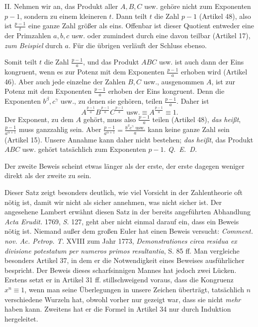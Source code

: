 II. Nehmen wir an, das Produkt aller $A,B,C$ usw. gehöre nicht zum Exponenten $p-1$, sondern zu einem kleineren $t$. Dann teilt $t$ die Zahl $p-1$ (Artikel 48), also ist $\frac{p-1}{t}$ eine ganze Zahl größer als eins. Offenbar ist dieser Quotient entweder eine der Primzahlen $a,b,c$ usw. oder zumindest durch eine davon teilbar (Artikel 17), \emph{zum Beispiel} durch $a$. Für die übrigen verläuft der Schluss ebenso.

Somit teilt $t$ die Zahl $\frac{p-1}{a}$, und das Produkt $ABC$ usw. ist auch dann der Eins kongruent, wenn es zur Potenz mit dem Exponenten ${\frac{p-1}{a}}$ erhoben wird (Artikel 46). Aber auch jede einzelne der Zahlen $B,C$ usw., ausgenommen $A$, ist zur Potenz mit dem Exponenten ${\frac{p-1}{a}}$ erhoben der Eins kongruent. Denn die Exponenten $b^\beta,c^\gamma$ usw., zu denen sie gehören, teilen $\frac{p-1}{a}$. Daher ist
\[A^{\frac{p-1}{a}}B^{\frac{p-1}{a}}C^{\frac{p-1}{a}}\text{ usw.}\equiv A^{\frac{p-1}{a}}\equiv1.\]
Der Exponent, zu dem $A$ gehört, muss also $\frac{p-1}{a}$ teilen (Artikel 48), \emph{das heißt}, $\frac{p-1}{a^{\alpha+1}}$ muss ganzzahlig sein. Aber $\frac{p-1}{a^{\alpha+1}}=\frac{b^\beta c^\gamma\text{ usw.}}{a}$ kann keine ganze Zahl sein (Artikel 15). Unsere Annahme kann daher nicht bestehen; \emph{das heißt}, das Produkt $ABC$ usw. gehört tatsächlich zum Exponenten $p-1$. \mbox{\emph{Q. E. D.}}

Der zweite Beweis scheint etwas länger als der erste, der erste dagegen weniger direkt als der zweite zu sein.

Dieser Satz zeigt besonders deutlich, wie viel Vorsicht in der Zahlentheorie oft nötig ist, damit wir nicht als sicher annehmen, was nicht sicher ist. Der angesehene Lambert erwähnt diesen Satz in der bereits angeführten Abhandlung \emph{Acta Erudit.} 1769, \emph{S.} 127, geht aber nicht einmal darauf ein, dass ein Beweis nötig ist. Niemand außer dem großen Euler hat einen Beweis versucht: \emph{Comment. nov. Ac. Petrop. T.} XVIII zum Jahr 1773, \emph{Demonstrationes circa residua ex divisione potestatum per numeros primos resultantia}, S. 85 ff. Man vergleiche besonders Artikel 37, in dem er die Notwendigkeit eines Beweises ausführlicher bespricht. Der Beweis dieses scharfsinnigen Mannes hat jedoch zwei Lücken. Erstens setzt er in Artikel 31 ff. stillschweigend voraus, dass die Kongruenz $x^n\equiv1$, wenn man seine Überlegungen in unsere Zeichen überträgt, tatsächlich $n$ verschiedene Wurzeln hat, obwohl vorher nur gezeigt war, dass sie nicht \emph{mehr} haben kann. Zweitens hat er die Formel in Artikel 34 nur durch Induktion hergeleitet.


